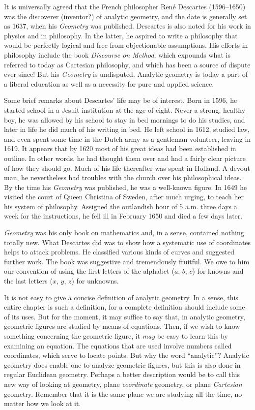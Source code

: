 \documentclass[11pt]{book}
\theoremstyle{bkplain}
\begin{document}
It is universally agreed that the French philosopher Ren\'e Descartes
(1596--1650) was the discoverer (inventor?) of analytic geometry, and the date
is generally set as 1637, when his \emph{Geometry} was published. Descartes is
also noted for his work in physics and in philosophy. In the latter, he
aspired to write a philosophy that would be perfectly logical and free from
objectionable assumptions. His efforts in philosophy include the book
\emph{Discourse on Method}, which expounds what is referred to today as
Cartesian philosophy, and which has been a source of dispute ever since! But
his \emph{Geometry} is undisputed. Analytic geometry is today a part of a
liberal education as well as a necessity for pure and applied science.

Some brief remarks about Descartes' life may be of interest. Born in 1596, he
started school in a Jesuit institution at the age of eight. Never a strong,
healthy boy, he was allowed by his school to stay in bed mornings to do his
studies, and later in life he did much of his writing in bed. He left school
in 1612, studied law, and even spent some time in the Dutch army as a
gentleman volunteer, leaving in 1619. It appears that by 1620 most of his
great ideas had been established in outline. In other words, he had thought
them over and had a fairly clear picture of how they should go. Much of his
life thereafter was spent in Holland. A devout man, he nevertheless had
troubles with the church over his philosophical ideas. By the time his
\emph{Geometry} was published, he was a well-known figure. In 1649 he visited
the court of Queen Christina of Sweden, after much urging, to teach her his
system of philosophy. Assigned the outlandish hour of 5 a.m. three days a week
for the instructions, he fell ill in February 1650 and died a few days later.

\emph{Geometry} was his only book on mathematics and, in a sense, contained
nothing totally new. What Descartes did was to show how a systematic use of
coordinates helps to attack problems. He classified various kinds of curves
and suggested further work. The book was suggestive and tremendously fruitful.
We owe to him our convention of using the first letters of the alphabet
($a$, $b$, $c$) for knowns and the last letters ($x$, $y$, $z$) for unknowns.

It is not easy to give a concise definition of analytic geometry. In a sense,
this entire chapter is such a definition, for a complete definition should
include some of its uses. But for the moment, it may suffice to say that, in
analytic geometry, geometric figures are studied by means of equations. Then,
if we wish to know something concerning the geometric figure, it \emph{may} be
easy to learn this by examining an equation. The equations that are used
involve numbers called coordinates, which serve to locate points. But why the
word ``analytic''? Analytic geometry does enable one to analyze geometric
figures, but this is also done in regular Euclidean geometry. Perhaps a better
description would be to call this new way of looking at geometry, plane
\emph{coordinate} geometry, or plane \emph{Cartesian} geometry. Remember that
it is the same plane we are studying all the time, no matter how we look at it.
\end{document}
